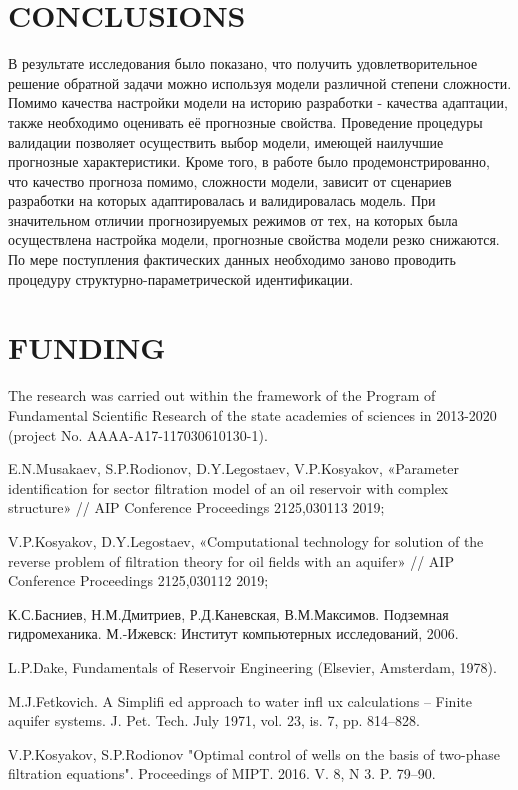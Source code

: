 \documentclass{article}
\begin{document}
\section{CONCLUSIONS}

В результате исследования было показано, что получить удовлетворительное решение обратной задачи можно используя модели различной степени сложности. Помимо качества настройки модели на историю разработки - качества адаптации, также необходимо оценивать её прогнозные свойства. Проведение процедуры валидации позволяет осуществить выбор модели, имеющей наилучшие прогнозные характеристики. Кроме того, в работе было продемонстрированно, что качество прогноза помимо, сложности модели, зависит от сценариев разработки на которых адаптировалась и валидировалась модель. При  значительном отличии прогнозируемых режимов от тех, на которых была осуществлена настройка модели, прогнозные свойства модели резко снижаются. По мере поступления фактических данных необходимо заново проводить процедуру структурно-параметрической идентификации.

\section{FUNDING}
The research was carried out within the framework of the Program of Fundamental Scientific Research of the state academies of sciences in 2013-2020 (project No. AAAA-A17-117030610130-1).

%
%
\begin{thebibliography}{99}
 E.N.Musakaev, S.P.Rodionov, D.Y.Legostaev, V.P.Kosyakov,  «Parameter identification for sector filtration model of an oil reservoir with complex structure» // AIP Conference Proceedings 2125,030113 2019;

 V.P.Kosyakov, D.Y.Legostaev,  «Computational technology for solution of the reverse problem of filtration theory for oil fields with an aquifer» // AIP Conference Proceedings 2125,030112 2019;

 К.С.Басниев, Н.М.Дмитриев, Р.Д.Каневская, В.М.Максимов. Подземная гидромеханика.  М.-Ижевск: Институт компьютерных исследований, 2006. 

 L.P.Dake, Fundamentals of Reservoir Engineering (Elsevier, Amsterdam, 1978).

 M.J.Fetkovich. A Simplifi ed approach to water infl ux calculations – Finite aquifer systems. J. Pet. Tech. July 1971, vol. 23, is. 7, pp. 814–828.

 V.P.Kosyakov, S.P.Rodionov "Optimal control of wells on the basis of two-phase filtration equations". Proceedings of MIPT. 2016. V. 8, N 3. P. 79–90.


\end{thebibliography}
\end{document}
